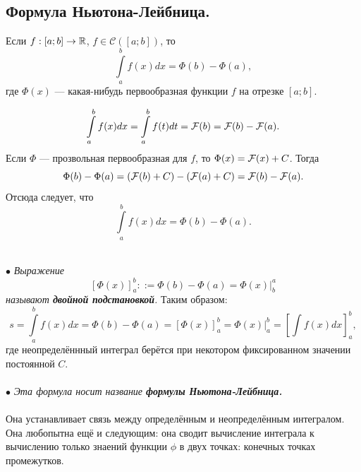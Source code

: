 \subsection{Формула Ньютона-Лейбница.}
\begin{theorem}
	Если $f:[a;b] \to \mathbb{R}$, $f\in\mathcal{C}([a;b])$, то $$\int\limits_a^bf(x)dx = \Phi (b) - \Phi (a),$$ где $\Phi(x)$ --- какая-нибудь первообразная функции $f$ на отрезке $[a;b]$.
	\end{theorem}
\begin{Proof}
	$$\int\limits_a^bf(x)dx = \int\limits_a^bf(t)dt=\mathcal{F}(b) = \mathcal{F}(b) - \mathcal{F}(a).$$
	Если $\Phi$ --- прозвольная первообразная для $f$, то $\Phi(x) = \mathcal{F}(x) + C$. Тогда $$\Phi(b) - \Phi(a) = (\mathcal{F}(b) + C) - (\mathcal{F}(a) + C) = \mathcal{F}(b) - \mathcal{F}(a).$$
	Отсюда следует, что $$\int\limits_a^b f(x)dx = \Phi(b) - \Phi(a).$$
	\end{Proof}\\
	$\bullet$ \textit{Выражение $$[\Phi(x)]_a^b::=\Phi(b) - \Phi(a) = \Phi(x)|^a_b$$ называют \textbf{двойной подстановкой}.}
Таким образом:
$$s = \int\limits_a^b f(x)dx= \Phi(b) - \Phi(a)=[\Phi(x)]^b_a= \Phi(x)\bigg|^b_a = [\int\limits f(x)dx]_a^b,$$ где неопределённный интеграл берётся при некотором фиксированном значении постоянной $C$.\\\\
$\bullet$ \textit{Эта формула носит название \textbf{формулы Ньютона-Лейбница.}}\\\\
Она устанавливает связь между определённым и неопределённым интегралом. Она любопытна ещё и следующим: она сводит вычисление интеграла к вычислению только знаений функции $\phi$ в двух точках: конечных точках промежутков. 
